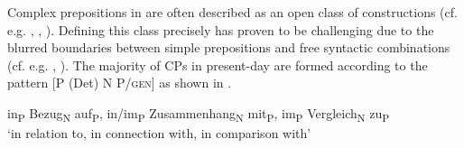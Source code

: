 \documentclass[output=paper,colorlinks,citecolor=brown]{langscibook}
\begin{document}
Complex prepositions in  are often described as an open class of constructions (cf. e.g. \citealt{Meola2000}, \citealt{Szczepaniak2009}, \citealt{HüningEtAl2020}). Defining this class precisely has proven to be challenging due to the blurred boundaries between simple prepositions and free syntactic combinations (cf. e.g. \citealt[17]{LehmannStolz1992}, \citealt{Meibauer1995}). The majority of CPs in present-day  are formed according to the pattern [P (Det) N P/\textsc{gen}] as shown in .

\ea%
\label{ex:fleissner:5}
\gll in\textsubscript{P} {Bezug}\textsubscript{N} auf\textsubscript{P}, 
in/im\textsubscript{P} {Zusammenhang}\textsubscript{N} {mit}\textsubscript{P}, im\textsubscript{P} {Vergleich}\textsubscript{N} {zu}\textsubscript{P}\\
‘in relation to, in connection with, in comparison with'\\
\z 
\end{document}
